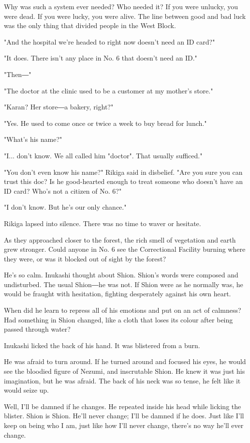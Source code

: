 Why was such a system ever needed? Who needed it? If you were unlucky,
you were dead. If you were lucky, you were alive. The line between good
and bad luck was the only thing that divided people in the West Block.

"And the hospital we're headed to right now doesn't need an ID card?"

"It does. There isn't any place in No. 6 that doesn't need an ID."

"Then―"

"The doctor at the clinic used to be a customer at my mother's store."

"Karan? Her store―a bakery, right?"

"Yes. He used to come once or twice a week to buy bread for lunch."

"What's his name?"

"I... don't know. We all called him "doctor". That usually sufficed."

"You don't even know his name?" Rikiga said in disbelief. "Are you sure
you can trust this doc? Is he good-hearted enough to treat someone who
doesn't have an ID card? Who's not a citizen of No. 6?"

"I don't know. But he's our only chance."

Rikiga lapsed into silence. There was no time to waver or hesitate.

As they approached closer to the forest, the rich smell of vegetation
and earth grew stronger. Could anyone in No. 6 see the Correctional
Facility burning where they were, or was it blocked out of sight by the
forest?~

He's so calm. Inukashi thought about Shion. Shion's words were composed
and undisturbed. The usual Shion―he was not. If Shion were as he
normally was, he would be fraught with hesitation, fighting desperately
against his own heart.

When did he learn to repress all of his emotions and put on an act of
calmness? Had something in Shion changed, like a cloth that loses its
colour after being passed through water?

Inukashi licked the back of his hand. It was blistered from a burn.

He was afraid to turn around. If he turned around and focused his eyes,
he would see the bloodied figure of Nezumi, and inscrutable Shion. He
knew it was just his imagination, but he was afraid. The back of his
neck was so tense, he felt like it would seize up.

Well, I'll be damned if he changes. He repeated inside his head while
licking the blister. Shion is Shion. He'll never change; I'll be damned
if he does. Just like I'll keep on being who I am, just like how I'll
never change, there's no way he'll ever change.

